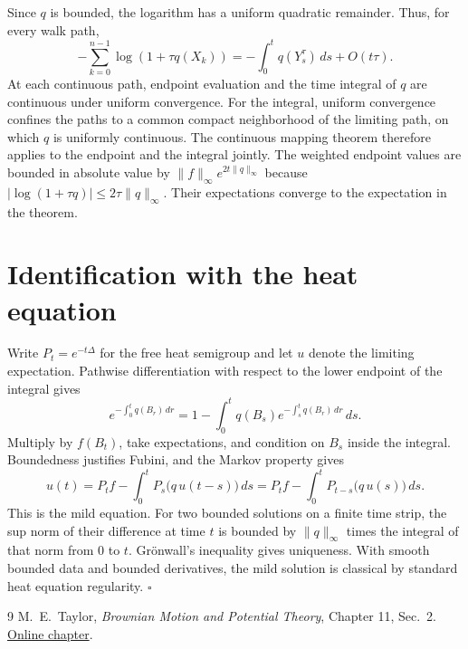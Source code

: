 \documentclass[11pt]{article}
\begin{document}
Since $q$ is bounded, the logarithm has a uniform quadratic
remainder. Thus, for every walk path,
\[
 -\sum_{k=0}^{n-1}\log(1+\tau q(X_k))
 =-\int_0^t q(Y^\tau_s)\,ds+O(t\tau).
\]
At each continuous path, endpoint evaluation and the time integral of
$q$ are continuous under uniform convergence. For the integral, uniform
convergence confines the paths to a common compact neighborhood of the
limiting path, on which $q$ is uniformly continuous. The continuous
mapping theorem therefore applies to the endpoint and the integral
jointly. The weighted endpoint values are bounded in absolute value by
$\|f\|_\infty e^{2t\|q\|_\infty}$ because
$|\log(1+\tau q)|\le 2\tau\|q\|_\infty$. Their expectations converge to
the expectation in the theorem.

\section{Identification with the heat equation}
Write $P_t=e^{-t\Delta}$ for the free heat semigroup and let $u$ denote
the limiting expectation. Pathwise differentiation with respect to
the lower endpoint of the integral gives
\[
 e^{-\int_0^t q(B_r)\,dr}
  =1-\int_0^t q(B_s)e^{-\int_s^t q(B_r)\,dr}\,ds.
\]
Multiply by $f(B_t)$, take expectations, and condition on $B_s$ inside
the integral. Boundedness justifies Fubini, and the Markov property
gives
\[
 u(t)=P_tf-\int_0^t P_s\bigl(q\,u(t-s)\bigr)\,ds
     =P_tf-\int_0^t P_{t-s}\bigl(q\,u(s)\bigr)\,ds.
\]
This is the mild equation. For two bounded solutions on a finite time
strip, the sup norm of their difference at time $t$ is bounded by
$\|q\|_\infty$ times the integral of that norm from $0$ to $t$.
Gr\"onwall's inequality gives uniqueness. With smooth bounded data
and bounded derivatives, the mild solution is classical by standard
heat equation regularity. \hfill$\square$

\begin{thebibliography}{9}
 M.~E.~Taylor, \emph{Brownian Motion and Potential
Theory}, Chapter 11, Sec.~2.
\href{https://mtaylor.web.unc.edu/wp-content/uploads/sites/16915/2018/04/chap11.pdf}{Online chapter}.
\end{thebibliography}
\end{document}
